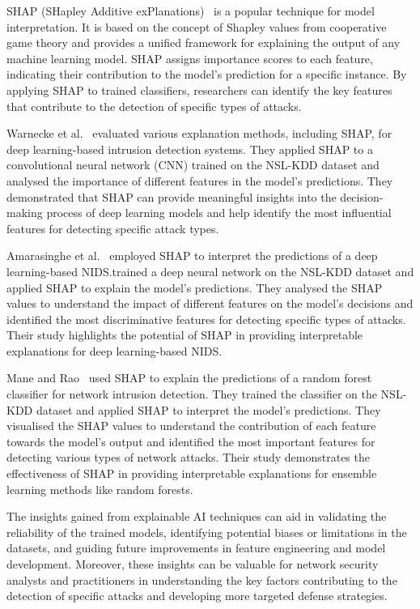 SHAP (SHapley Additive exPlanations)~\cite{lundberg2017unified} is a popular technique for model interpretation. It is based on the concept of Shapley values from cooperative game theory and provides a unified framework for explaining the output of any machine learning model. SHAP assigns importance scores to each feature, indicating their contribution to the model's prediction for a specific instance. By applying SHAP to trained classifiers, researchers can identify the key features that contribute to the detection of specific types of attacks.

Warnecke et al.~\cite{warnecke2020evaluating} evaluated various explanation methods, including SHAP, for deep learning-based intrusion detection systems. They applied SHAP to a convolutional neural network (CNN) trained on the NSL-KDD dataset and analysed the importance of different features in the model's predictions. They demonstrated that SHAP can provide meaningful insights into the decision-making process of deep learning models and help identify the most influential features for detecting specific attack types.

Amarasinghe et al.~\cite{amarasinghe2018toward} employed SHAP to interpret the predictions of a deep learning-based NIDS.\@They trained a deep neural network on the NSL-KDD dataset and applied SHAP to explain the model's predictions. They analysed the SHAP values to understand the impact of different features on the model's decisions and identified the most discriminative features for detecting specific types of attacks. Their study highlights the potential of SHAP in providing interpretable explanations for deep learning-based NIDS.\@

Mane and Rao~\cite{mane2021explaining} used SHAP to explain the predictions of a random forest classifier for network intrusion detection. They trained the classifier on the NSL-KDD dataset and applied SHAP to interpret the model's predictions. They visualised the SHAP values to understand the contribution of each feature towards the model's output and identified the most important features for detecting various types of network attacks. Their study demonstrates the effectiveness of SHAP in providing interpretable explanations for ensemble learning methods like random forests.

The insights gained from explainable AI techniques can aid in validating the reliability of the trained models, identifying potential biases or limitations in the datasets, and guiding future improvements in feature engineering and model development. Moreover, these insights can be valuable for network security analysts and practitioners in understanding the key factors contributing to the detection of specific attacks and developing more targeted defense strategies.